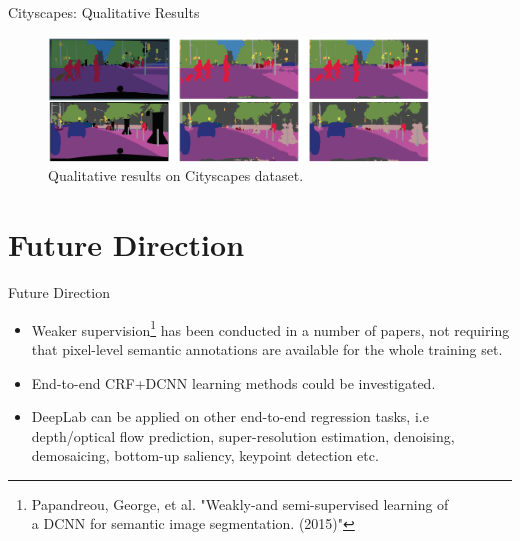 \documentclass{beamer}
\begin{document}
\begin{frame}{Cityscapes: Qualitative Results}	
\begin{figure}
	\centering
	\includegraphics[width=0.90\textwidth]{figure/ss39.png}
	\captionsetup{justification=centering}
	\caption{Qualitative results on Cityscapes dataset.}
	\label{fig:M6}
\end{figure}
\end{frame}

\section{Future Direction}
\begin{frame}{Future Direction}
\begin{itemize}
\item<1-> {\color{blue}Weaker supervision\footnote{Papandreou, George, et al. "Weakly-and semi-supervised learning of\\ a DCNN for semantic image segmentation. (2015)" }} has been conducted in a number of papers, not requiring that pixel-level semantic annotations are available for the whole training set.
\item<2-> {\color{blue}End-to-end CRF+DCNN} learning methods could be investigated.
\item<3-> DeepLab can be applied on other {\color{blue}end-to-end regression tasks}, i.e depth/optical flow prediction, super-resolution estimation, denoising, demosaicing, bottom-up saliency, keypoint detection etc.
\end{itemize}
\end{frame}
\end{document}
